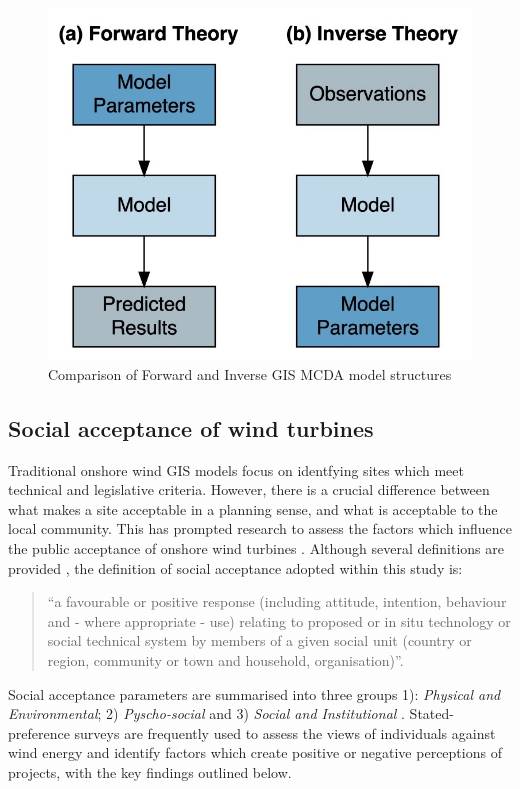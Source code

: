 \documentclass[a4paper,]{article}
\theoremstyle{definition}
\theoremstyle{definition}
\theoremstyle{definition}
\theoremstyle{remark}
\begin{document}
\begin{figure}[h]

{\centering \includegraphics[width=0.5\linewidth]{figures/figure4} 

}

\caption{Comparison of Forward and Inverse GIS MCDA model structures}\label{fig:InverseGIS}
\end{figure}

\hypertarget{acceptance}{%
\subsection{Social acceptance of wind turbines}\label{acceptance}}

Traditional onshore wind GIS models focus on identfying sites which meet technical and legislative criteria. However, there is a crucial difference between what makes a site acceptable in a planning sense, and what is acceptable to the local community. This has prompted research to assess the factors which influence the public acceptance of onshore wind turbines \citep{Langer2016}. Although several definitions are provided \citep[p.~107]{Upham2015}, the definition of social acceptance adopted within this study is:

\begin{quote}
``a favourable or positive response (including attitude, intention, behaviour and - where appropriate - use) relating to proposed or in situ technology or social technical system by members of a given social unit (country or region, community or town and household, organisation)''.
\end{quote}

Social acceptance parameters are summarised into three groups 1): \emph{Physical and Environmental}; 2) \emph{Pyscho-social} and 3) \emph{Social and Institutional} \citep{Langer2016}. Stated-preference surveys are frequently used to assess the views of individuals against wind energy and identify factors which create positive or negative perceptions of projects, with the key findings outlined below.
\end{document}
